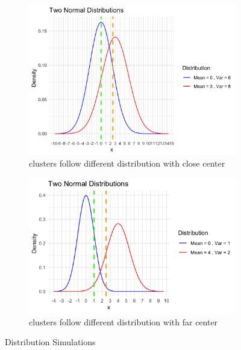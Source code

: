 \documentclass{article}
\begin{document}
\begin{figure}[h]
  \vspace{1em} %
  
  \begin{subfigure}{0.49\textwidth}
      \centering
      \includegraphics[width=\textwidth]{images/dist_simu/1-0_6-3_8.png} %
      \caption{clusters follow different distribution with close center}
  \end{subfigure}
  \hfill
  \begin{subfigure}{0.49\textwidth}
      \centering
      \includegraphics[width=\textwidth]{images/dist_simu/2-0_1-4_2.png} %
      \caption{clusters follow different distribution with far center}
  \end{subfigure}

  \caption{Distribution Simulations}
  \label{fig:dist_sim}
\end{figure}
\end{document}

